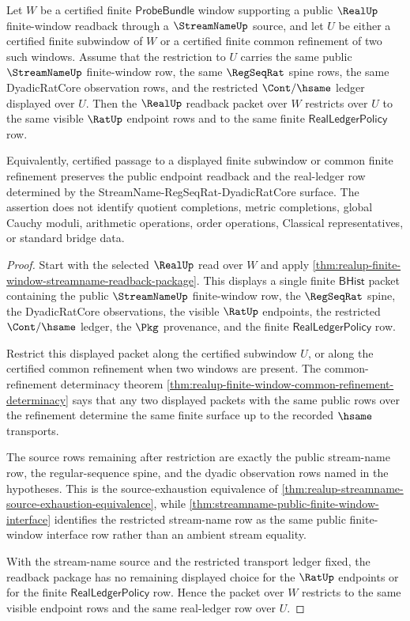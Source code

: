 \begin{theorem}
\label{thm:realup-finite-window-streamname-readback-uniformity}
Let $W$ be a certified finite $\mathsf{ProbeBundle}$ window supporting a public
$\RealUp$ finite-window readback through a $\StreamNameUp$ source, and let
$U$ be either a certified finite subwindow of $W$ or a certified finite common
refinement of two such windows. Assume that the restriction to $U$ carries the
same public $\StreamNameUp$ finite-window row, the same $\RegSeqRat$ spine rows,
the same DyadicRatCore observation rows, and the restricted $\Cont/\hsame$
ledger displayed over $U$. Then the $\RealUp$ readback packet over $W$
restricts over $U$ to the same visible $\RatUp$ endpoint rows and to the same
finite $\mathsf{RealLedgerPolicy}$ row.

Equivalently, certified passage to a displayed finite subwindow or common
finite refinement preserves the public endpoint readback and the real-ledger
row determined by the StreamName-RegSeqRat-DyadicRatCore surface. The assertion
does not identify quotient completions, metric completions, global Cauchy
moduli, arithmetic operations, order operations, Classical representatives, or
standard bridge data.
\end{theorem}
\begin{proof}
Start with the selected $\RealUp$ read over $W$ and apply
\autoref{thm:realup-finite-window-streamname-readback-package}. This displays a
single finite $\mathsf{BHist}$ packet containing the public $\StreamNameUp$
finite-window row, the $\RegSeqRat$ spine, the DyadicRatCore observations, the
visible $\RatUp$ endpoints, the restricted $\Cont/\hsame$ ledger, the
$\Pkg$ provenance, and the finite $\mathsf{RealLedgerPolicy}$ row.

Restrict this displayed packet along the certified subwindow $U$, or along the
certified common refinement when two windows are present. The common-refinement
determinacy theorem
\autoref{thm:realup-finite-window-common-refinement-determinacy} says that any
two displayed packets with the same public rows over the refinement determine
the same finite surface up to the recorded $\hsame$ transports.

The source rows remaining after restriction are exactly the public stream-name
row, the regular-sequence spine, and the dyadic observation rows named in the
hypotheses. This is the source-exhaustion equivalence of
\autoref{thm:realup-streamname-source-exhaustion-equivalence}, while
\autoref{thm:streamname-public-finite-window-interface} identifies the
restricted stream-name row as the same public finite-window interface row
rather than an ambient stream equality.

With the stream-name source and the restricted transport ledger fixed, the
readback package has no remaining displayed choice for the $\RatUp$ endpoints
or for the finite $\mathsf{RealLedgerPolicy}$ row. Hence the packet over $W$
restricts to the same visible endpoint rows and the same real-ledger row over
$U$.
\end{proof}

